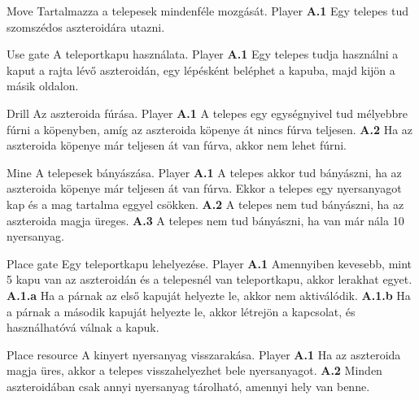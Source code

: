 \documentclass[../../projlab]{subfiles}
\begin{document}
\begin{use-case}
	{Move}
	{Tartalmazza a telepesek mindenféle mozgását.}
	{Player}
    \textbf{A.1} Egy telepes tud szomszédos aszteroidára utazni.
\end{use-case}

\begin{use-case}
	{Use gate}
	{A teleportkapu használata.}
	{Player}
    \textbf{A.1} Egy telepes tudja használni a kaput a rajta lévő aszteroidán, egy lépésként beléphet a kapuba, majd kijön a másik oldalon.  
\end{use-case}

\begin{use-case}
	{Drill}
	{Az aszteroida fúrása.}
	{Player}
    \textbf{A.1} A telepes egy egységnyivel tud mélyebbre fúrni a köpenyben, amíg az aszteroida köpenye át nincs fúrva teljesen.
	\newline
	\textbf{A.2} Ha az aszteroida köpenye már teljesen át van fúrva, akkor nem lehet fúrni.
\end{use-case}

\begin{use-case}
	{Mine}
	{A telepesek bányászása.}
	{Player}
    \textbf{A.1} A telepes akkor tud bányászni, ha az aszteroida köpenye már teljesen át van fúrva. Ekkor a telepes egy nyersanyagot kap és a mag tartalma eggyel csökken.
	\newline
	\textbf{A.2} A telepes nem tud bányászni, ha az aszteroida magja üreges.
	\newline
	\textbf{A.3} A telepes nem tud bányászni, ha van már nála 10 nyersanyag.
\end{use-case}

\begin{use-case}
	{Place gate}
	{Egy teleportkapu lehelyezése.}
	{Player}
    \textbf{A.1} Amennyiben kevesebb, mint 5 kapu van az aszteroidán és a telepesnél van teleportkapu, akkor lerakhat egyet.
	\newline
	\textbf{A.1.a} Ha a párnak az első kapuját helyezte le, akkor nem aktiválódik.
	\newline
	\textbf{A.1.b} Ha a párnak a második kapuját helyezte le, akkor létrejön a kapcsolat, és használhatóvá válnak a kapuk. 
\end{use-case}

\begin{use-case}
	{Place resource}
	{A kinyert nyersanyag visszarakása.}
	{Player}
    \textbf{A.1} Ha az aszteroida magja üres, akkor a telepes visszahelyezhet bele nyersanyagot.
	\newline
	\textbf{A.2} Minden aszteroidában csak annyi nyersanyag tárolható, amennyi hely van benne.
\end{use-case}
\end{document}

